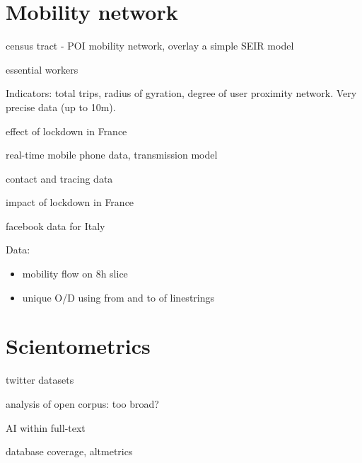 \documentclass[10pt]{article}
\begin{document}
\cite{huanglarge}

\cite{ivey2020land}


	
\section{Mobility network}


\cite{chang2020mobility} census tract - POI mobility network, overlay a simple SEIR model

\cite{batty2020london} essential workers

	
\cite{Pepe2020.03.22.20039933} Indicators: total trips, radius of gyration, degree of user proximity network. Very precise data (up to 10m).

\cite{pullano2020population} effect of lockdown in France



\cite{jia2020population} real-time mobile phone data, transmission model

\cite{Zhangeabb8001} contact and tracing data


\cite{salje:pasteur-02548181} impact of lockdown in France


\cite{Bonaccorsi15530} facebook data for Italy
	
\cite{kissler2020reductions}
	
Data:

\begin{itemize}
	\item mobility flow on 8h slice
	\item unique O/D using from and to of linestrings
\end{itemize}





\section{Scientometrics}

\cite{inuwadutse2020curated} twitter datasets

\cite{Colavizza2020.04.20.046144} analysis of open corpus: too broad?

\cite{khamsi2020coronavirus} AI within full-text

\cite{2020arXiv200410400K} database coverage, altmetrics

	
	
	
	


	
	
\end{document}
